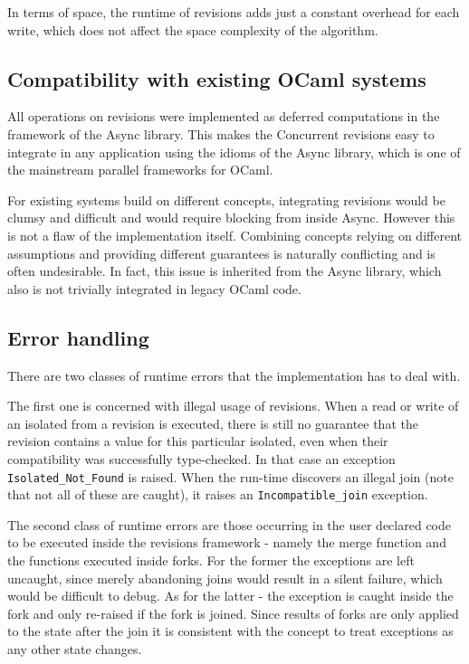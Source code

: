 \documentclass[12pt,twoside,notitlepage]{report}
\begin{document}
In terms of space, the runtime of revisions adds just a constant overhead for each write, which does not affect the space complexity of the algorithm.     

\subsection{Compatibility with existing OCaml systems}
All operations on revisions were implemented as deferred computations in the framework of the Async library. This makes the Concurrent revisions easy to integrate in any application using the idioms of the Async library, which is one of the mainstream parallel frameworks for OCaml.

For existing systems build on different concepts, integrating revisions would be clumsy and difficult and would require blocking from inside Async. However this is not a flaw of the implementation itself. Combining concepts relying on different assumptions and providing different guarantees is naturally conflicting and is often undesirable. In fact, this issue is inherited from the Async library, which also is not trivially integrated in legacy OCaml code.     

\subsection{Error handling}
\label{errors}
There are two classes of runtime errors that the implementation has to deal with.
 
The first one is concerned with illegal usage of revisions. When a read or write of an isolated from a revision is executed, there is still no guarantee that the revision contains a value for this particular isolated, even when their compatibility was successfully type-checked. In that case an exception {\tt Isolated\_Not\_Found} is raised. When the run-time discovers an illegal join (note that not all of these are caught), it raises an {\tt Incompatible\_join} exception.

The second class of runtime errors are those occurring in the user declared code to be executed inside the revisions framework - namely the merge function and the functions executed inside forks. For the former the exceptions are left uncaught, since merely abandoning joins would result in a silent failure, which would be difficult to debug. As for the latter - the exception is caught inside the fork and only re-raised if the fork is joined. Since results of forks are only applied to the state after the join it is consistent with the concept to treat exceptions as any other state changes.  
 
\end{document}
